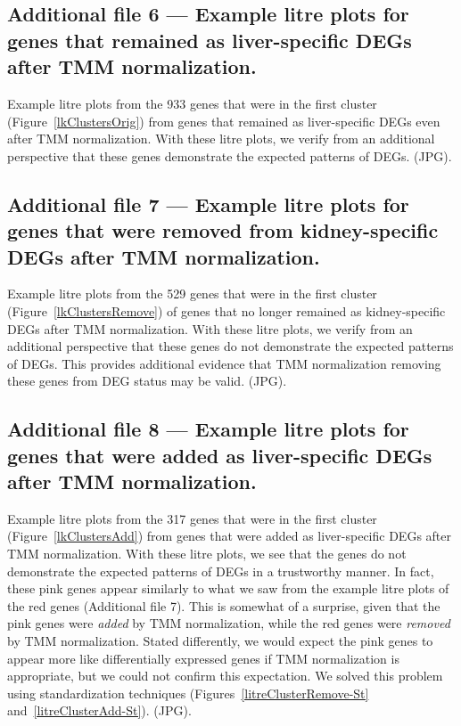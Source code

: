 \documentclass{bmcart}
\begin{document}
\begin{linenumbers}
\begin{backmatter}
  \subsection*{Additional file 6 --- Example litre plots for genes that remained as liver-specific DEGs after TMM normalization.}
    Example litre plots from the 933 genes that were in the first cluster (Figure~\ref{lkClustersOrig}) from genes that remained as liver-specific DEGs even after TMM normalization. With these litre plots, we verify from an additional perspective that these genes demonstrate the expected patterns of DEGs. (JPG).    
    
  \subsection*{Additional file 7 --- Example litre plots for genes that were removed from kidney-specific DEGs after TMM normalization.}
    Example litre plots from the 529 genes that were in the first cluster (Figure~\ref{lkClustersRemove}) of genes that no longer remained as kidney-specific DEGs after TMM normalization. With these litre plots, we verify from an additional perspective that these genes do not demonstrate the expected patterns of DEGs. This provides additional evidence that TMM normalization removing these genes from DEG status may be valid. (JPG).     
    
  \subsection*{Additional file 8 --- Example litre plots for genes that were added as liver-specific DEGs after TMM normalization.}
    Example litre plots from the 317 genes that were in the first cluster (Figure~\ref{lkClustersAdd}) from genes that were added as liver-specific DEGs after TMM normalization. With these litre plots, we see that the genes do not demonstrate the expected patterns of DEGs in a trustworthy manner. In fact, these pink genes appear similarly to what we saw from the example litre plots of the red genes (Additional file 7). This is somewhat of a surprise, given that the pink genes were \textit{added} by TMM normalization, while the red genes were \textit{removed} by TMM normalization. Stated differently, we would expect the pink genes to appear more like differentially expressed genes if TMM normalization is appropriate, but we could not confirm this expectation. We solved this problem using standardization techniques (Figures~\ref{litreClusterRemove-St} and~\ref{litreClusterAdd-St}). (JPG).

\end{backmatter}
\end{linenumbers} %
\end{document}
